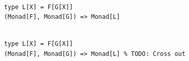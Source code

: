 \documentclass{beamer}
\begin{document}
\begin{frame}[fragile]

  \centering
  \large

  \begin{minipage}{0.75\textwidth}
    \begin{verbatim}

      type L[X] = F[G[X]]
      (Monad[F], Monad[G]) => Monad[L]

    \end{verbatim}
  \end{minipage}

\end{frame}

\begin{frame}[fragile]

  \centering
  \large

  \begin{minipage}{0.75\textwidth}
    \begin{verbatim}

      type L[X] = F[G[X]]
      (Monad[F], Monad[G]) => Monad[L] % TODO: Cross out

    \end{verbatim}
  \end{minipage}

\end{frame}
\end{document}
